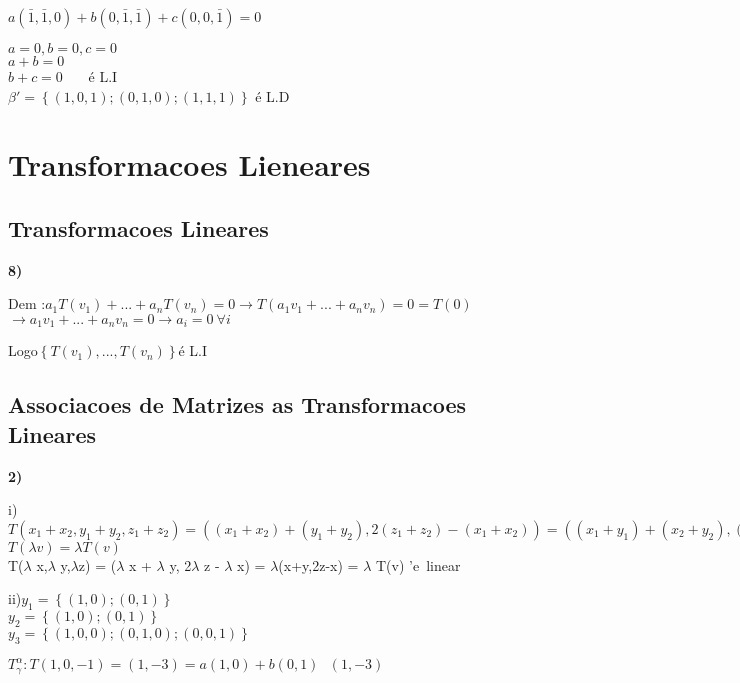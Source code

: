 \documentclass[a4paper,12pt]{report}
\begin{document}
$a(\bar{1}, \bar{1},0)   +    b( 0, \bar{1} , \bar{1})  + c (0,0,\bar{1})  = 0$

$a = 0 , b = 0  , c = 0$ \\

$a+b = 0 $\\

$b+c = 0 $ \ \ \ \'e L.I \\

$\beta' = \left \{ (1,0,1) ; (0,1,0); (1,1,1) \right \}$ \'e L.D


\chapter{Transformacoes Lieneares }
\section{Transformacoes Lineares}
\textbf{8)}

Dem :$ a_1T(v_1) + ...+a_nT(v_n) = 0 \rightarrow T(a_1v_1+...+a_nv_n) = 0 = T(0)$ $\rightarrow a_1v_1+...+a_nv_n = 0 \rightarrow a_i = 0\ \forall i $

Logo$ \left \{ T(v_1),...,T(v_n)\right \} $\'e L.I


\section{Associacoes de Matrizes as Transformacoes Lineares }

\textbf{2)}

i)$T(x_1 + x_2,y_1+y_2,z_1+z_2) = ( (x_1+x_2) + (y_1+y_2), 2(z_1+z_2) - (x_1+x_2)) = ((x_1+y_1)+ (x_2+y_2),(2z_1 - x_1) + (2z_2 - x_2)) = T(v_1) + T(v_2)$\\

$T(\lambda v) = \lambda T(v)$ \\

T($\lambda$ x,$\lambda$ y,$\lambda$z) = ($ \lambda$ x + $\lambda$ y, 2$\lambda$ z - $\lambda$ x) = $\lambda$(x+y,2z-x) = $\lambda$ T(v) 'e\ linear

ii)$ y_1= \left \{ (1,0); (0,1) \right \}$ \\

$y_2 = \left \{ (1,0); (0,1) \right \}$ \\

$y_3 = \left \{ (1,0,0);(0,1,0);(0,0,1) \right \}$

$T_\gamma^\alpha : T(1,0,-1) = (1,-3) = a(1,0) + b(0,1)    \ \ \ (1,-3)$ \\
\end{document}
